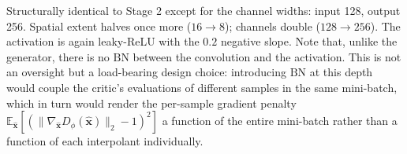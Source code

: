 
Structurally identical to Stage 2 except for the channel widths: input
128, output 256. Spatial extent halves once more ($16 \to 8$); channels
double ($128 \to 256$). The activation is again leaky-ReLU with the
$0.2$ negative slope. Note that, unlike the generator, there is no
$\mathrm{BN}$ between the convolution and the activation. This is not
an oversight but a load-bearing design choice: introducing
$\mathrm{BN}$ at this depth would couple the critic's evaluations of
different samples in the same mini-batch, which in turn would render the
per-sample gradient penalty
$\mathbb{E}_{\hat{\mathbf{x}}}[(\|\nabla_{\hat{\mathbf{x}}}
D_\phi(\hat{\mathbf{x}})\|_2 - 1)^2]$ a function of the entire mini-batch
rather than a function of each interpolant individually.
